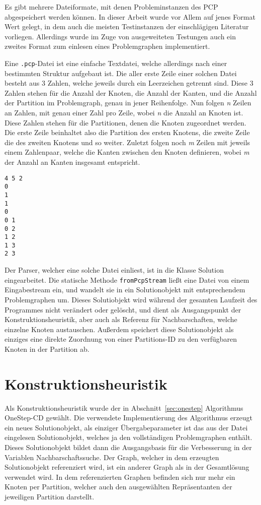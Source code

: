 Es gibt mehrere Dateiformate, mit denen Probleminstanzen des PCP abgespeichert werden können. In dieser Arbeit wurde vor Allem auf jenes
Format Wert gelegt, in dem auch die meisten Testinstanzen der einschlägigen Literatur vorliegen. Allerdings wurde im Zuge von ausgeweiteten 
Testungen auch ein zweites Format zum einlesen eines Problemgraphen implementiert. 

Eine \texttt{.pcp}-Datei ist eine einfache Textdatei, welche allerdings nach einer bestimmten Struktur aufgebaut ist. Die aller erste Zeile
einer solchen Datei besteht aus 3 Zahlen, welche jeweils durch ein Leerzeichen getrennt sind. Diese 3 Zahlen stehen für die Anzahl der Knoten, 
die Anzahl der Kanten, und die Anzahl der Partition im Problemgraph, genau in jener Reihenfolge. Nun folgen \textit{n} Zeilen an Zahlen, mit 
genau einer Zahl pro Zeile, wobei \textit{n} die Anzahl an Knoten ist. Diese Zahlen stehen für die Partitionen, denen die Knoten zugeordnet werden.
Die erste Zeile beinhaltet also die Partition des ersten Knotens, die zweite Zeile die des zweiten Knotens und so weiter. Zuletzt folgen noch
\textit{m} Zeilen mit jeweils einem Zahlenpaar, welche die Kanten zwischen den Knoten definieren, wobei \textit{m} der Anzahl an Kanten insgesamt
entspricht.

\singlespacing
\begin{lstlisting}[caption={Eine einfache \textit{.pcp}-Beispieldatei},label={lst:pcp}]
4 5 2
0
1
1
0
0 1
0 2
1 2
1 3
2 3
\end{lstlisting}

Der Parser, welcher eine solche Datei einliest, ist in die Klasse Solution eingearbeitet. Die statische Methode \texttt{fromPcpStream} ließt eine
Datei von einem Eingabestream ein, und wandelt sie in ein Solutionobjekt mit entsprechendem Problemgraphen um. Dieses Solutiobjekt wird während
der gesamten Laufzeit des Programmes nicht verändert oder gelöscht, und dient als Ausgangspunkt der Konstruktionsheuristik, aber auch als
Referenz für Nachbarschaften, welche einzelne Knoten austauschen. Außerdem speichert diese Solutionobjekt als einziges eine direkte Zuordnung von einer Partitions-ID
zu den verfügbaren Knoten in der Partition ab. 

\section{Konstruktionsheuristik}
Als Konstruktionsheuristik wurde der in Abschnitt~\ref{sec:onestep} Algorithmus OneStep-CD gewählt. Die verwendete Implementierung des Algorithmus
erzeugt ein neues Solutionobjekt, als einziger Übergabeparameter ist das aus der Datei eingelesen Solutionobjekt, welches ja den vollständigen Problemgraphen
enthält. Dieses Solutionobjekt bildet dann die Ausgangsbasis für die Verbesserung in der Variablen Nachbarschaftssuche. Der Graph, welcher in dem erzeugten Solutionobjekt
referenziert wird, ist ein anderer Graph als in der Gesamtlösung verwendet wird. In dem referenzierten Graphen befinden sich nur mehr ein Knoten per Partition, welcher auch den ausgewählten Repräsentanten der jeweiligen Partition darstellt.

